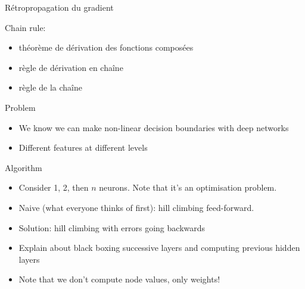 





Rétropropagation du gradient

Chain rule:
\begin{itemize}
\item théorème de dérivation des fonctions composées
\item règle de dérivation en chaîne
\item règle de la chaîne
\end{itemize}

Problem
\begin{itemize}
\item We know we can make non-linear decision boundaries with deep networks
\item Different features at different levels
\end{itemize}

Algorithm
\begin{itemize}
\item Consider 1, 2, then $n$ neurons.  Note that it's an optimisation problem.
\item Naive (what everyone thinks of first): hill climbing feed-forward.
\item Solution: hill climbing with errors going backwards
\item Explain about black boxing successive layers and computing previous hidden layers
\item Note that we don't compute node values, only weights!
\end{itemize}


